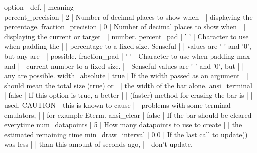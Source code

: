 \begin{DoxyPre}     option             | def.  |  meaning
     --------------------------------------------------------------------
     percent\_precision  | 2     |  Number of decimal places to show when
                        |       |  displaying the percentage.
     fraction\_precision | 0     |  Number of decimal places to show when
                        |       |  displaying the current or target
                        |       |  number.
     percent\_pad        | ' '   |  Character to use when padding the
                        |       |  percentage to a fixed size. Senseful
                        |       |  values are ' ' and '0', but any are
                        |       |  possible.
     fraction\_pad       | ' '   |  Character to use when padding max and
                        |       |  current number to a fixed size.
                        |       |  Senseful values are ' ' and '0', but 
                        |       |  any are possible.
     width\_absolute     | true  |  If the width passed as an argument
                        |       |  should mean the total size (true) or
                        |       |  the width of the bar alone.
     ansi\_terminal      | false |  If this option is true, a better
                        |       |  (faster) method for erasing the bar is
                        |       |  used. CAUTION - this is known to cause
                        |       |  problems with some terminal emulators,
                        |       |  for example Eterm.
     ansi\_clear         | false |  If the bar should be cleared everytime
     num\_datapoints     | 5     |  How many datapoints to use to create 
                        |       |  the estimated remaining time 
     min\_draw\_interval  | 0.0   |  If the last call to \hyperlink{class_console___progress_bar_ad80c69eaa9fce4b141bdef8a23797f94}{update()} was less
                        |       |  than this amount of seconds ago, 
                        |       |  don't update.
 \end{DoxyPre}



